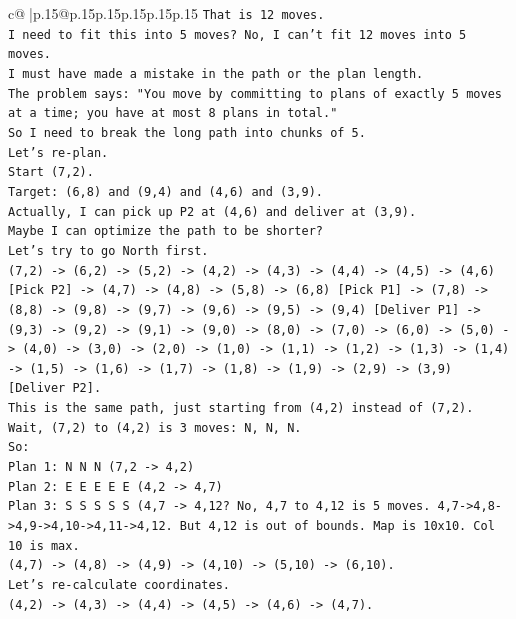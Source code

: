 \documentclass{article}
\begin{document}
{\begin{supertabular}{c@{$\;$}|p{.15\linewidth}@{}p{.15\linewidth}p{.15\linewidth}p{.15\linewidth}p{.15\linewidth}p{.15\linewidth}}
{{{\texttt{That is 12 moves.} \\
\texttt{I need to fit this into 5 moves? No, I can't fit 12 moves into 5 moves.} \\
\texttt{I must have made a mistake in the path or the plan length.} \\
\texttt{The problem says: "You move by committing to plans of exactly 5 moves at a time; you have at most 8 plans in total."} \\
\texttt{So I need to break the long path into chunks of 5.} \\
\texttt{Let's re{-}plan.} \\
\texttt{Start (7,2).} \\
\texttt{Target: (6,8) and (9,4) and (4,6) and (3,9).} \\
\texttt{Actually, I can pick up P2 at (4,6) and deliver at (3,9).} \\
\texttt{Maybe I can optimize the path to be shorter?} \\
\texttt{Let's try to go North first.} \\
\texttt{(7,2) {-}> (6,2) {-}> (5,2) {-}> (4,2) {-}> (4,3) {-}> (4,4) {-}> (4,5) {-}> (4,6) {[}Pick P2{]} {-}> (4,7) {-}> (4,8) {-}> (5,8) {-}> (6,8) {[}Pick P1{]} {-}> (7,8) {-}> (8,8) {-}> (9,8) {-}> (9,7) {-}> (9,6) {-}> (9,5) {-}> (9,4) {[}Deliver P1{]} {-}> (9,3) {-}> (9,2) {-}> (9,1) {-}> (9,0) {-}> (8,0) {-}> (7,0) {-}> (6,0) {-}> (5,0) {-}> (4,0) {-}> (3,0) {-}> (2,0) {-}> (1,0) {-}> (1,1) {-}> (1,2) {-}> (1,3) {-}> (1,4) {-}> (1,5) {-}> (1,6) {-}> (1,7) {-}> (1,8) {-}> (1,9) {-}> (2,9) {-}> (3,9) {[}Deliver P2{]}.} \\
\texttt{This is the same path, just starting from (4,2) instead of (7,2).} \\
\texttt{Wait, (7,2) to (4,2) is 3 moves: N, N, N.} \\
\texttt{So:} \\
\texttt{Plan 1: N N N (7,2 {-}> 4,2)} \\
\texttt{Plan 2: E E E E E (4,2 {-}> 4,7)} \\
\texttt{Plan 3: S S S S S (4,7 {-}> 4,12? No, 4,7 to 4,12 is 5 moves. 4,7{-}>4,8{-}>4,9{-}>4,10{-}>4,11{-}>4,12. But 4,12 is out of bounds. Map is 10x10. Col 10 is max.} \\
\texttt{(4,7) {-}> (4,8) {-}> (4,9) {-}> (4,10) {-}> (5,10) {-}> (6,10).} \\
\texttt{Let's re{-}calculate coordinates.} \\
\texttt{(4,2) {-}> (4,3) {-}> (4,4) {-}> (4,5) {-}> (4,6) {-}> (4,7).} \\
}}}
\end{supertabular}}
\end{document}
